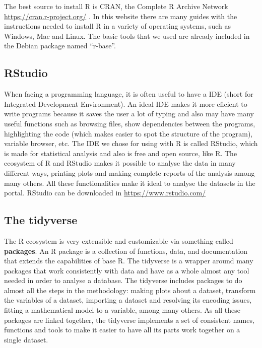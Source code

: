 \documentclass[]{book}
\begin{document}
The best source to install R is CRAN, the Complete R Archive Network
\url{https://cran.r-project.org/} . In this website there are many
guides with the instructions needed to install R in a variety of
operating systems, such as Windows, Mac and Linux. The basic tools that
we used are already included in the Debian package named ``r-base''.

\subsection{RStudio}\label{rstudio}

When facing a programming language, it is often useful to have a IDE
(short for Integrated Development Environment). An ideal IDE makes it
more eficient to write programs because it saves the user a lot of
typing and also may have many useful functions such as browsing files,
show dependencies between the programs, highlighting the code (which
makes easier to spot the structure of the program), variable browser,
etc. The IDE we chose for using with R is called RStudio, which is made
for statistical analysis and also is free and open source, like R. The
ecosystem of R and RStudio makes it possible to analyse the data in many
different ways, printing plots and making complete reports of the
analysis among many others. All these functionalities make it ideal to
analyse the datasets in the portal. RStudio can be downloaded in
\url{https://www.rstudio.com/}

\subsection{The tidyverse}\label{the-tidyverse}

The R ecosystem is very extensible and customizable via something called
\textbf{packages}. An R package is a collection of functions, data, and
documentation that extends the capabilities of base R. The tidyverse is
a wrapper around many packages that work consistently with data and have
as a whole almost any tool needed in order to analyse a database. The
tidyverse includes packages to do almost all the steps in the
methodology: making plots about a dataset, transform the variables of a
dataset, importing a dataset and resolving its encoding issues, fitting
a mathematical model to a variable, among many others. As all these
packages are linked together, the tidyverse implements a set of
consistent names, functions and tools to make it easier to have all its
parts work together on a single dataset.
\end{document}
